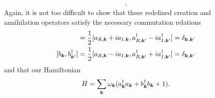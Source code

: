 {\begin{align}
,\end{align}
Again, it is not too difficult to show that these redefined creation and annihilation operators satisfy the necessary commutation relations
\begin{align}
    [a_{\vb*{k}},a_{\vb*{k}'}^{\dagger}] = \frac{1}{2} [ a_{R,\vb*{k}} + i a_{I,\vb*{k}}, a_{R,\vb*{k}'}^{\dagger} - i a_{I,\vb*{k}'}^{\dagger} ] = \delta_{\vb*{k},\vb*{k}'} \\
    [b_{\vb*{k}},b_{\vb*{k}'}^{\dagger}] = \frac{1}{2} [ a_{R,\vb*{k}} - i a_{I,\vb*{k}}, a_{R,\vb*{k}'}^{\dagger} + i a_{I,\vb*{k}'}^{\dagger} ] = \delta_{\vb*{k},\vb*{k}'}
\end{align}
and that our Hamiltonian
\begin{align}
    H = \sum_{\vb*{k}} \omega_{\vb*{k}} ( a_{\vb*{k}}^{\dagger} a_{\vb*{k}} + b_{\vb*{k}}^{\dagger} b_{\vb*{k}} + 1 )
.\end{align}

}
